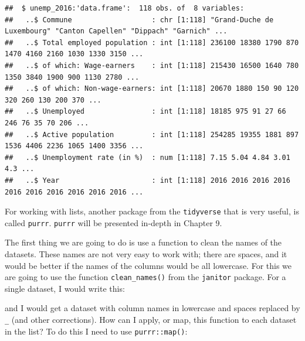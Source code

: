 \documentclass[]{gitbook}
\newenvironment{Shaded}{\begin{snugshade}}{\end{snugshade}}
\newcommand{\KeywordTok}[1]{\textcolor[rgb]{0.13,0.29,0.53}{\textbf{#1}}}
\newcommand{\NormalTok}[1]{#1}
\newcommand{\OperatorTok}[1]{\textcolor[rgb]{0.81,0.36,0.00}{\textbf{#1}}}
\newcommand{\StringTok}[1]{\textcolor[rgb]{0.31,0.60,0.02}{#1}}
\theoremstyle{definition}
\theoremstyle{definition}
\theoremstyle{definition}
\theoremstyle{remark}
\begin{document}
\begin{verbatim}
##  $ unemp_2016:'data.frame':  118 obs. of  8 variables:
##   ..$ Commune                   : chr [1:118] "Grand-Duche de Luxembourg" "Canton Capellen" "Dippach" "Garnich" ...
##   ..$ Total employed population : int [1:118] 236100 18380 1790 870 1470 4160 2160 1030 1330 3150 ...
##   ..$ of which: Wage-earners    : int [1:118] 215430 16500 1640 780 1350 3840 1900 900 1130 2780 ...
##   ..$ of which: Non-wage-earners: int [1:118] 20670 1880 150 90 120 320 260 130 200 370 ...
##   ..$ Unemployed                : int [1:118] 18185 975 91 27 66 246 76 35 70 206 ...
##   ..$ Active population         : int [1:118] 254285 19355 1881 897 1536 4406 2236 1065 1400 3356 ...
##   ..$ Unemployment rate (in %)  : num [1:118] 7.15 5.04 4.84 3.01 4.3 ...
##   ..$ Year                      : int [1:118] 2016 2016 2016 2016 2016 2016 2016 2016 2016 2016 ...
\end{verbatim}

For working with lists, another package from the \texttt{tidyverse} that
is very useful, is called \texttt{purrr}. \texttt{purrr} will be
presented in-depth in Chapter 9.

The first thing we are going to do is use a function to clean the names
of the datasets. These names are not very easy to work with; there are
spaces, and it would be better if the names of the columns would be all
lowercase. For this we are going to use the function
\texttt{clean\_names()} from the \texttt{janitor} package. For a single
dataset, I would write this:

\begin{Shaded}
\end{Shaded}

and I would get a dataset with column names in lowercase and spaces
replaced by \texttt{\_} (and other corrections). How can I apply, or
map, this function to each dataset in the list? To do this I need to use
\texttt{purrr::map()}:

\begin{Shaded}
\end{Shaded}
\end{document}
